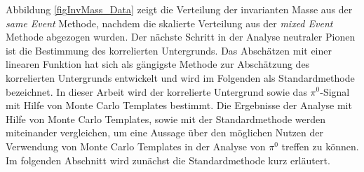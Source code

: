 \newline
Abbildung \ref{figInvMass_Data} zeigt die Verteilung der invarianten Masse aus der \textit{same Event} Methode, nachdem die skalierte Verteilung aus der \textit{mixed Event} Methode abgezogen wurden.
\newline
Der nächste Schritt in der Analyse neutraler Pionen ist die Bestimmung des korrelierten Untergrunds.
Das Abschätzen mit einer linearen Funktion hat sich als gängigste Methode zur Abschätzung des korrelierten Untergrunds entwickelt und wird im Folgenden als Standardmethode bezeichnet.
In dieser Arbeit wird der korrelierte Untergrund sowie das $\pi^{0}$-Signal mit Hilfe von Monte Carlo Templates bestimmt.
Die Ergebnisse der Analyse mit Hilfe von Monte Carlo Templates, sowie mit der Standardmethode werden miteinander vergleichen, um eine Aussage über den möglichen Nutzen der Verwendung von Monte Carlo Templates in der Analyse von $\pi^{0}$ treffen zu können.
Im folgenden Abschnitt wird zunächst die Standardmethode kurz erläutert.